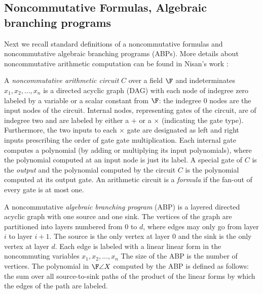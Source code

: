 \subsection*{Noncommutative Formulas, Algebraic branching programs} 

Next we recall standard definitions of a noncommutative formulas and
noncommutative algebraic branching programs (ABPs). More details about
noncommutative arithmetic computation can be found in Nisan's work
\cite{N91}:
  
A \emph{noncommutative arithmetic circuit} $C$ over a field $\F$ and
indeterminates $x_1,x_2,\ldots,x_n$ is a directed acyclic graph (DAG)
with each node of indegree zero labeled by a variable or a scalar
constant from $\F$: the indegree $0$ nodes are the input nodes of the
circuit. Internal nodes, representing gates of the circuit, are of
indegree two and are labeled by either a $+$ or a $\times$ (indicating
the gate type). Furthermore, the two inputs to each $\times$ gate are
designated as left and right inputs prescribing the order of gate gate
multiplication. Each internal gate computes a polynomial (by adding or
multiplying its input polynomials), where the polynomial computed at
an input node is just its label.  A special gate of $C$ is the
\emph{output} and the polynomial computed by the circuit $C$ is the
polynomial computed at its output gate. An arithmetic circuit is a
\emph{formula} if the fan-out of every gate is at most one.\smallskip

A noncommutative \emph{algebraic branching program} (ABP) is a layered
directed acyclic graph with one source and one sink. The vertices of
the graph are partitioned into layers numbered from $0$ to $d$, where
edges may only go from layer $i$ to layer $i+1$. The source is the
only vertex at layer $0$ and the sink is the only vertex at layer
$d$. Each edge is labeled with a linear linear form in the
noncommuting variables $x_1, x_2, \ldots, x_n$ The size of the ABP is
the number of vertices. The polynomial in $\F\angle{X}$ computed by
the ABP is defined as follows: the sum over all source-to-sink paths
of the product of the linear forms by which the edges of the path are
labeled.

%
%

